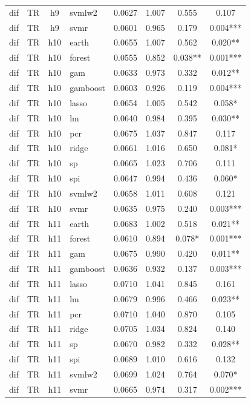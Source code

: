 \begin{ThreePartTable}
\begin{longtable}[t]{llclcccc}
dif & TR & h9 & svmlw2 & 0.0627 & 1.007 & 0.555 & 0.107\\
dif & TR & h9 & svmr & 0.0601 & 0.965 & 0.179 & 0.004***\\
\addlinespace
dif & TR & h10 & earth & 0.0655 & 1.007 & 0.562 & 0.020**\\
dif & TR & h10 & forest & 0.0555 & 0.852 & 0.038** & 0.001***\\
dif & TR & h10 & gam & 0.0633 & 0.973 & 0.332 & 0.012**\\
dif & TR & h10 & gamboost & 0.0603 & 0.926 & 0.119 & 0.004***\\
dif & TR & h10 & lasso & 0.0654 & 1.005 & 0.542 & 0.058*\\
dif & TR & h10 & lm & 0.0640 & 0.984 & 0.395 & 0.030**\\
dif & TR & h10 & pcr & 0.0675 & 1.037 & 0.847 & 0.117\\
dif & TR & h10 & ridge & 0.0661 & 1.016 & 0.650 & 0.081*\\
dif & TR & h10 & sp & 0.0665 & 1.023 & 0.706 & 0.111\\
dif & TR & h10 & spi & 0.0647 & 0.994 & 0.436 & 0.060*\\
dif & TR & h10 & svmlw2 & 0.0658 & 1.011 & 0.608 & 0.121\\
dif & TR & h10 & svmr & 0.0635 & 0.975 & 0.240 & 0.003***\\
\addlinespace
dif & TR & h11 & earth & 0.0683 & 1.002 & 0.518 & 0.021**\\
dif & TR & h11 & forest & 0.0610 & 0.894 & 0.078* & 0.001***\\
dif & TR & h11 & gam & 0.0675 & 0.990 & 0.420 & 0.011**\\
dif & TR & h11 & gamboost & 0.0636 & 0.932 & 0.137 & 0.003***\\
dif & TR & h11 & lasso & 0.0710 & 1.041 & 0.845 & 0.161\\
dif & TR & h11 & lm & 0.0679 & 0.996 & 0.466 & 0.023**\\
dif & TR & h11 & pcr & 0.0710 & 1.040 & 0.870 & 0.105\\
dif & TR & h11 & ridge & 0.0705 & 1.034 & 0.824 & 0.140\\
dif & TR & h11 & sp & 0.0670 & 0.982 & 0.332 & 0.028**\\
dif & TR & h11 & spi & 0.0689 & 1.010 & 0.616 & 0.132\\
dif & TR & h11 & svmlw2 & 0.0699 & 1.024 & 0.764 & 0.070*\\
dif & TR & h11 & svmr & 0.0665 & 0.974 & 0.317 & 0.002***\\

\end{longtable}
\end{ThreePartTable}
